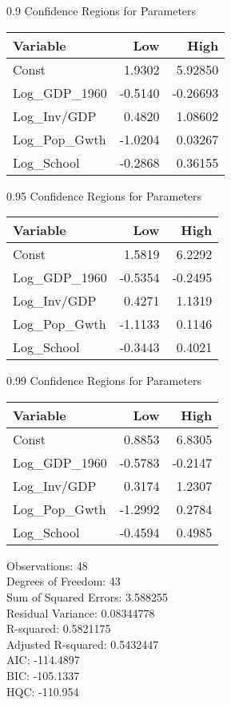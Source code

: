 0.9 Confidence Regions for Parameters \\
\begin{tabular}{l*{2}{r}}
\toprule
Variable    &   Low            &   High \\
\midrule 
Const   &    1.9302   &    5.92850 \\
Log\_GDP\_1960   &   -0.5140   &   -0.26693 \\
Log\_Inv/GDP   &    0.4820   &    1.08602 \\
Log\_Pop\_Gwth   &   -1.0204   &    0.03267 \\
Log\_School   &   -0.2868   &    0.36155 \\
\bottomrule
\end{tabular}
\bigskip 

0.95 Confidence Regions for Parameters \\
\begin{tabular}{l*{2}{r}}
\toprule
Variable    &   Low            &   High \\
\midrule 
Const   &    1.5819   &    6.2292 \\
Log\_GDP\_1960   &   -0.5354   &   -0.2495 \\
Log\_Inv/GDP   &    0.4271   &    1.1319 \\
Log\_Pop\_Gwth   &   -1.1133   &    0.1146 \\
Log\_School   &   -0.3443   &    0.4021 \\
\bottomrule
\end{tabular}
\bigskip 

0.99 Confidence Regions for Parameters \\
\begin{tabular}{l*{2}{r}}
\toprule
Variable    &   Low            &   High \\
\midrule 
Const   &    0.8853   &    6.8305 \\
Log\_GDP\_1960   &   -0.5783   &   -0.2147 \\
Log\_Inv/GDP   &    0.3174   &    1.2307 \\
Log\_Pop\_Gwth   &   -1.2992   &    0.2784 \\
Log\_School   &   -0.4594   &    0.4985 \\
\bottomrule
\end{tabular}
\bigskip 

Observations:                       48 \\
Degrees of Freedom:                 43 \\
Sum of Squared Errors:              3.588255 \\
Residual Variance:                  0.08344778 \\
R-squared:                          0.5821175 \\
Adjusted R-squared:                 0.5432447 \\
AIC:                                -114.4897 \\
BIC:                                -105.1337 \\
HQC:                                -110.954 \\

